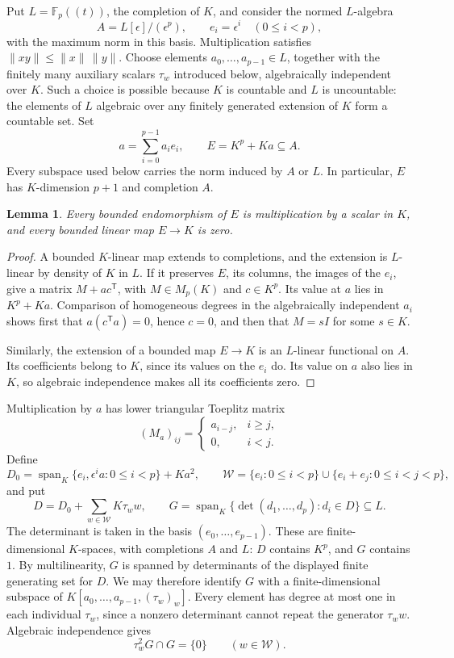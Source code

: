 \documentclass[11pt]{amsart}
\newtheorem{lemma}[theorem]{Lemma}
\theoremstyle{definition}
\theoremstyle{remark}
\numberwithin{equation}{section}
\newcommand{\F}{\mathbb F}
\newcommand{\spn}{\operatorname{span}}
\newcommand{\norm}[1]{\lVert #1\rVert}
\theoremstyle{plain}
\theoremstyle{definition}
\theoremstyle{plain}
\begin{document}
Put $L=\F_p((t))$, the completion of $K$, and consider the normed $L$\nobreakdash-algebra
\[
A=L[\epsilon]/(\epsilon^p),\qquad e_i=\epsilon^i\quad(0\le i<p),
\]
with the maximum norm in this basis. Multiplication satisfies $\norm{xy}\le\norm x\,\norm y$.
Choose elements $a_0,\ldots,a_{p-1}\in L$, together with the finitely many auxiliary scalars
$\tau_w$ introduced below, algebraically independent over $K$. Such a choice is possible because $K$ is
countable and $L$ is uncountable: the elements of $L$ algebraic over any finitely generated extension of
$K$ form a countable set. Set
\[
a=\sum_{i=0}^{p-1}a_i e_i,\qquad E=K^p+Ka\subseteq A.
\]
Every subspace used below carries the norm induced by $A$ or $L$. In particular, $E$ has $K$\nobreakdash-dimension
$p+1$ and completion $A$.

\begin{lemma}\label{dom:rigid}
Every bounded endomorphism of $E$ is multiplication by a scalar in $K$, and every bounded linear map
$E\to K$ is zero.
\end{lemma}

\begin{proof}
A bounded $K$\nobreakdash-linear map extends to completions, and the extension is $L$\nobreakdash-linear
by density of $K$ in $L$. If it preserves $E$, its columns, the images of the $e_i$, give a matrix
$M+ac^{\mathsf T}$, with $M\in M_p(K)$ and $c\in K^p$. Its value at $a$ lies in $K^p+Ka$.
Comparison of homogeneous degrees in the algebraically independent $a_i$ shows first that
$a(c^{\mathsf T}a)=0$, hence $c=0$, and then that $M=sI$ for some $s\in K$.

Similarly, the extension of a bounded map $E\to K$ is an $L$\nobreakdash-linear functional on $A$.
Its coefficients belong to $K$, since its values on the $e_i$ do. Its value on $a$ also lies in $K$,
so algebraic independence makes all its coefficients zero.
\end{proof}

Multiplication by $a$ has lower triangular Toeplitz matrix
\[
(M_a)_{ij}=\begin{cases}a_{i-j},&i\ge j,\\0,&i<j.\end{cases}
\]
Define
\[
D_0=\spn_K\{e_i,\epsilon^i a:0\le i<p\}+Ka^2,
\qquad
\mathcal W=\{e_i:0\le i<p\}\cup\{e_i+e_j:0\le i<j<p\},
\]
and put
\[
D=D_0+\sum_{w\in\mathcal W}K\tau_w w,\qquad
G=\spn_K\{\det(d_1,\ldots,d_p):d_i\in D\}\subseteq L.
\]
The determinant is taken in the basis $(e_0,\ldots,e_{p-1})$. These are finite-dimensional
$K$\nobreakdash-spaces, with completions $A$ and $L$: $D$ contains $K^p$, and $G$ contains $1$.
By multilinearity, $G$ is spanned by determinants of the displayed finite generating set for $D$.
We may therefore identify $G$ with a finite-dimensional subspace of
$K[a_0,\ldots,a_{p-1},(\tau_w)_w]$. Every element has degree at most one in each individual $\tau_w$,
since a nonzero determinant cannot repeat the generator $\tau_w w$. Algebraic independence gives
\begin{equation}\label{dom:tau-gap}
\tau_w^2G\cap G=\{0\}\qquad(w\in\mathcal W).
\end{equation}
\end{document}
